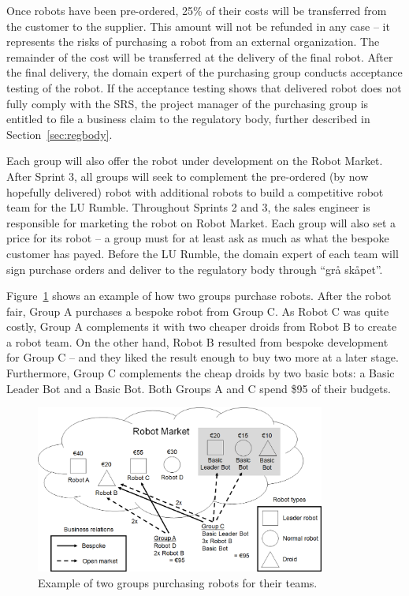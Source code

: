 \documentclass{scrreprt}
\begin{document}
Once robots have been pre-ordered, 25\% of their costs will be transferred from the customer to the supplier. This amount will not be refunded in any case -- it represents the risks of purchasing a robot from an external organization. The remainder of the cost will be transferred at the delivery of the final robot. After the final delivery, the domain expert of the purchasing group conducts acceptance testing of the robot. If the acceptance testing shows that delivered robot does not fully comply with the SRS, the project manager of the purchasing group is entitled to file a business claim to the regulatory body, further described in Section~\ref{sec:regbody}.

Each group will also offer the robot under development on the Robot Market. After Sprint 3, all groups will seek to complement the pre-ordered (by now hopefully delivered) robot with additional robots to build a competitive robot team for the LU Rumble. Throughout Sprints 2 and 3, the sales engineer is responsible for marketing the robot on Robot Market. Each group will also set a price for its robot -- a group must for at least ask as much as what the bespoke customer has payed. Before the LU Rumble, the domain expert of each team will sign purchase orders and deliver to the regulatory body through ``grå skåpet''. 

Figure~\ref{fig:market} shows an example of how two groups purchase robots. After the robot fair, Group A purchases a bespoke robot from Group C. As Robot C was quite costly, Group A complements it with two cheaper droids from Robot B to create a robot team. On the other hand, Robot B resulted from bespoke development for Group C -- and they liked the result enough to buy two more at a later stage. Furthermore, Group C complements the cheap droids by two basic bots: a Basic Leader Bot and a Basic Bot. Both Groups A and C spend \$95 of their budgets.

\begin{figure}
\centering
\includegraphics[width=0.85\textwidth]{figures/marketExample.png}
\caption{Example of two groups purchasing robots for their teams.}
\label{fig:market}
\end{figure}
\end{document}
